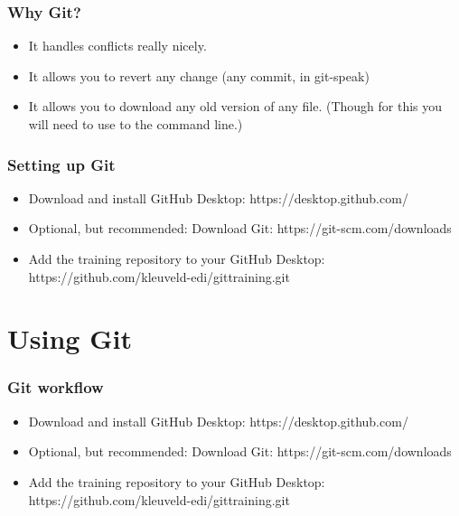 \documentclass{beamer}
\begin{document}

\begin{frame}
\frametitle{Why Git?}
\begin{itemize}
\item It handles conflicts really nicely.
\item It allows you to revert any change (any commit, in git-speak)
\item It allows you to download any old version of any file. (Though for this you will need to use to the command line.)
\end{itemize}
\end{frame}


\begin{frame}
\frametitle{Setting up Git}
\begin{itemize}
\item Download and install GitHub Desktop: https://desktop.github.com/
\item Optional, but recommended: Download Git: https://git-scm.com/downloads 
\item Add the training repository to your GitHub Desktop: https://github.com/kleuveld-edi/gittraining.git
\end{itemize}
\end{frame}

\section{Using Git} %

\begin{frame}
\frametitle{Git workflow}
\begin{itemize}
\item Download and install GitHub Desktop: https://desktop.github.com/
\item Optional, but recommended: Download Git: https://git-scm.com/downloads 
\item Add the training repository to your GitHub Desktop: https://github.com/kleuveld-edi/gittraining.git
\end{itemize}
\end{frame}
\end{document}
